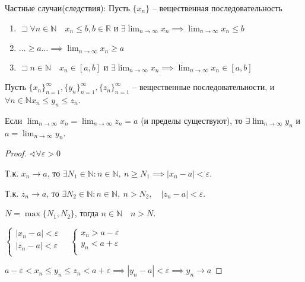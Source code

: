 \documentclass{book}
\newcommand\N{\ensuremath{\mathbb{N}}}
\newcommand\R{\ensuremath{\mathbb{R}}}
\theoremstyle{definition}
\begin{document}
    Частные случаи(следствия):
    Пусть $\{x_n\}$ -- вещественная последовательность
    \begin{enumerate}
        \item $\sqsupset \forall n\in \N \quad x_n\leqslant b, b\in \R$ и $\exists \lim_{n \to \infty} x_n \implies \lim_{n \to \infty} x_n\leqslant b$
        \item $\ldots \geqslant a \ldots \implies  \lim_{n \to \infty} x_n\geqslant a$
        \item $\sqsupset n\in \N \quad x_{n} \in[a,b]$ и $\exists \lim_{n \to \infty} x_n \implies \lim_{n \to \infty} x_n\in [a,b]$
    \end{enumerate}

    \begin{theorem}
        Пусть $\{x_n\}_{n=1}^{\infty }, \{y_{n} \}_{n=1}^{\infty}, \{z_n\}_{n=1}^{\infty }$ -- вещественные последовательности, и $\forall n\in \N  x_{n} \leqslant y_{n} \leqslant z_n$.

        Если $\lim_{n \to \infty} x_n = \lim_{n \to \infty}  z_n = a $ (и пределы существуют), то $\exists \lim_{n \to \infty} y_n$ и $a = \lim_{n \to \infty} y_{n}$.
    \end{theorem}
    \begin{proof}
        $\sphericalangle\forall  \varepsilon>0$

        Т.к. $x_n \to a$, то $\exists N_1\in \N : n\in \N,\ n\geqslant N_1 \implies \left| x_n-a \right| <\varepsilon$.

        Т.к. $z_n \to  a$, то $\exists N_2\in \N :n\in \N,\ n>N_2, \quad\left| z_n-a \right| <\varepsilon$.

        $N = \max\{N_1, N_2\}$, тогда $n\in \N \quad n>N$.

        $\begin{cases}
            \left| x_n-a \right| <\varepsilon\\
            \left| z_n-a \right| <\varepsilon\\
        \end{cases}\quad \begin{cases}
            x_n> a-\varepsilon\\
            y_n<a+\varepsilon\\
        \end{cases}$

        $a-\varepsilon <x_n\leqslant y_{n} \leqslant z_n<a+\varepsilon \implies \left| y_n-a \right| <\varepsilon \implies y_n\to a$
    \end{proof}
    
\end{document}

